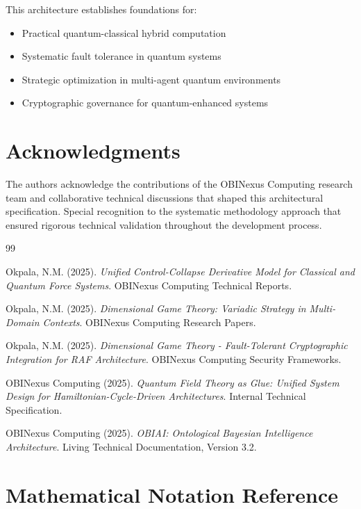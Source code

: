 \documentclass[12pt]{article}
\begin{document}
This architecture establishes foundations for:
\begin{itemize}
    \item Practical quantum-classical hybrid computation
    \item Systematic fault tolerance in quantum systems
    \item Strategic optimization in multi-agent quantum environments
    \item Cryptographic governance for quantum-enhanced systems
\end{itemize}

\section*{Acknowledgments}

The authors acknowledge the contributions of the OBINexus Computing research team and collaborative technical discussions that shaped this architectural specification. Special recognition to the systematic methodology approach that ensured rigorous technical validation throughout the development process.


\begin{thebibliography}{99}

Okpala, N.M. (2025). 
\emph{Unified Control-Collapse Derivative Model for Classical and Quantum Force Systems}.
OBINexus Computing Technical Reports.

Okpala, N.M. (2025).
\emph{Dimensional Game Theory: Variadic Strategy in Multi-Domain Contexts}.
OBINexus Computing Research Papers.

Okpala, N.M. (2025).
\emph{Dimensional Game Theory - Fault-Tolerant Cryptographic Integration for RAF Architecture}.
OBINexus Computing Security Frameworks.

OBINexus Computing (2025).
\emph{Quantum Field Theory as Glue: Unified System Design for Hamiltonian-Cycle-Driven Architectures}.
Internal Technical Specification.

OBINexus Computing (2025).
\emph{OBIAI: Ontological Bayesian Intelligence Architecture}.
Living Technical Documentation, Version 3.2.

\end{thebibliography}

\appendix

\section{Mathematical Notation Reference}
\end{document}
